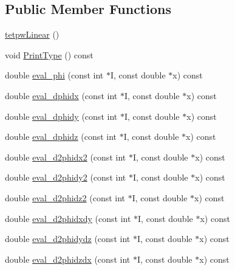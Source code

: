 \subsection*{Public Member Functions}
\begin{DoxyCompactItemize}
\item 
\mbox{\hyperlink{classfemus_1_1tetpw_linear_a9b4a3c907e55b240cda57d36b5dc1a61}{tetpw\+Linear}} ()
\item 
void \mbox{\hyperlink{classfemus_1_1tetpw_linear_a79576e1c49c1e056f3a869ba8e2a6a0a}{Print\+Type}} () const
\item 
double \mbox{\hyperlink{classfemus_1_1tetpw_linear_aff13fdb969801b6c5e6cfc15ca67a957}{eval\+\_\+phi}} (const int $\ast$I, const double $\ast$x) const
\item 
double \mbox{\hyperlink{classfemus_1_1tetpw_linear_a2a3c74824c709f2919aa9b0a8681d17e}{eval\+\_\+dphidx}} (const int $\ast$I, const double $\ast$x) const
\item 
double \mbox{\hyperlink{classfemus_1_1tetpw_linear_a75d4cc96948c8b36119ce628e2803783}{eval\+\_\+dphidy}} (const int $\ast$I, const double $\ast$x) const
\item 
double \mbox{\hyperlink{classfemus_1_1tetpw_linear_a6069f0d885dc151f2648b4ff587ef39f}{eval\+\_\+dphidz}} (const int $\ast$I, const double $\ast$x) const
\item 
double \mbox{\hyperlink{classfemus_1_1tetpw_linear_a2239d19a7d3a723383d68d5c38bfdbea}{eval\+\_\+d2phidx2}} (const int $\ast$I, const double $\ast$x) const
\item 
double \mbox{\hyperlink{classfemus_1_1tetpw_linear_af2376253bf50baccdfe001037aec48a2}{eval\+\_\+d2phidy2}} (const int $\ast$I, const double $\ast$x) const
\item 
double \mbox{\hyperlink{classfemus_1_1tetpw_linear_a199593a6ae0073aaa87a632933111e05}{eval\+\_\+d2phidz2}} (const int $\ast$I, const double $\ast$x) const
\item 
double \mbox{\hyperlink{classfemus_1_1tetpw_linear_ac652a9ba4f2d1fd2a140563ab97172e3}{eval\+\_\+d2phidxdy}} (const int $\ast$I, const double $\ast$x) const
\item 
double \mbox{\hyperlink{classfemus_1_1tetpw_linear_aca0418b87538842e22d123a82a5cb579}{eval\+\_\+d2phidydz}} (const int $\ast$I, const double $\ast$x) const
\item 
double \mbox{\hyperlink{classfemus_1_1tetpw_linear_a6b5280c580726c23a3d0557a95c39bd9}{eval\+\_\+d2phidzdx}} (const int $\ast$I, const double $\ast$x) const
\end{DoxyCompactItemize}
